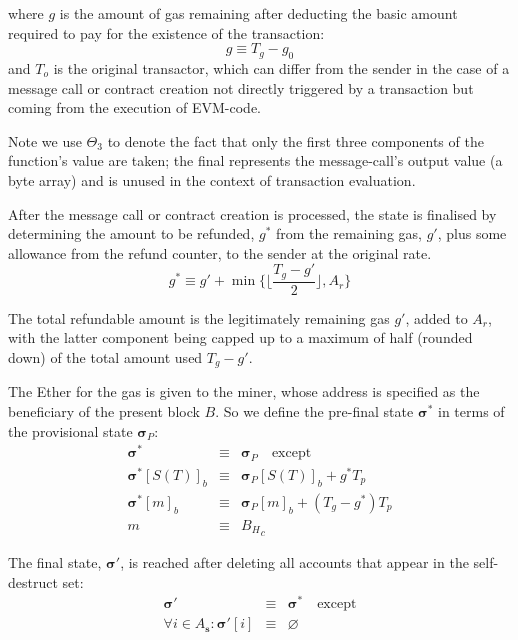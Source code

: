 \documentclass[9pt,oneside]{amsart}
\begin{document}
\begin{multicols}{2}
where $g$ is the amount of gas remaining after deducting the basic amount required to pay for the existence of the transaction:
\begin{equation}
g \equiv T_g - g_0
\end{equation}
and $T_o$ is the original transactor, which can differ from the sender in the case of a message call or contract creation not directly triggered by a transaction but coming from the execution of EVM-code.

Note we use $\Theta_{3}$ to denote the fact that only the first three components of the function's value are taken; the final represents the message-call's output value (a byte array) and is unused in the context of transaction evaluation.

After the message call or contract creation is processed, the state is finalised by determining the amount to be refunded, $g^*$ from the remaining gas, $g'$, plus some allowance from the refund counter, to the sender at the original rate.
\begin{equation}
g^* \equiv g' + \min \{ \Big\lfloor \dfrac{T_g - g'}{2} \Big\rfloor, A_r \}
\end{equation}

The total refundable amount is the legitimately remaining gas $g'$, added to $A_r$, with the latter component being capped up to a maximum of half (rounded down) of the total amount used $T_g - g'$.

The Ether for the gas is given to the miner, whose address is specified as the beneficiary of the present block $B$. So we define the pre-final state $\boldsymbol{\sigma}^*$ in terms of the provisional state $\boldsymbol{\sigma}_P$:
\begin{eqnarray}
\boldsymbol{\sigma}^* & \equiv & \boldsymbol{\sigma}_P \quad \text{except} \\
\boldsymbol{\sigma}^*[S(T)]_b & \equiv & \boldsymbol{\sigma}_P[S(T)]_b + g^* T_p \\
\boldsymbol{\sigma}^*[m]_b & \equiv & \boldsymbol{\sigma}_P[m]_b + (T_g - g^*) T_p \\
m & \equiv & {B_H}_c
\end{eqnarray}

The final state, $\boldsymbol{\sigma}'$, is reached after deleting all accounts that appear in the self-destruct set:
\begin{eqnarray}
\boldsymbol{\sigma}' & \equiv & \boldsymbol{\sigma}^* \quad \text{except} \\
\forall i \in A_\mathbf{s}: \boldsymbol{\sigma}'[i] & \equiv & \varnothing
\end{eqnarray}


\end{multicols}
\end{document}
